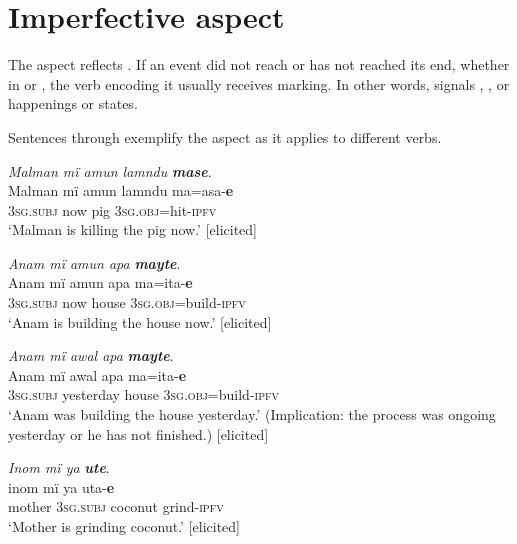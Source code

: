 
\section{{Imperfective} {aspect}}\label{sec:4.4}


The  aspect reflects . If an event did not reach or has not reached its end, whether in  or  , the verb encoding it usually receives  marking. In other words,   signals , , or  happenings or states.

  Sentences  through  exemplify the  aspect as it applies to different verbs.

\ea%
    \label{ex:verbs:17}
          \textit{Malman mï amun lamndu} \textbf{\textit{mase}}.\\
\gll Malman  mï    amun  lamndu  ma=asa-\textbf{e}\\
    [name]  3\textsc{sg.subj}  now  pig      3\textsc{sg.obj=}hit-\textsc{ipfv}\\
\glt `Malman is killing the pig now.’ [elicited]
\z

\ea%
    \label{ex:verbs:18}
          \textit{Anam mï amun apa} \textbf{\textit{mayte}}.\\
\gll Anam  mï      amun  apa  ma=ita-\textbf{e}\\
    [name]  3\textsc{sg.subj}  now  house  3\textsc{sg.obj=}build-\textsc{ipfv}\\
\glt `‎‎Anam is building the house now.’ [elicited]
\z

\ea%
    \label{ex:verbs:19}
          \textit{Anam mï awal apa} \textbf{\textit{mayte}}.\\
\gll Anam  mï      awal    apa    ma=ita-\textbf{e}\\
    [name]  3\textsc{sg.subj}  yesterday  house  3\textsc{sg.obj=}build-\textsc{ipfv}\\
\glt `Anam was building the house yesterday.’ (Implication: the process was ongoing yesterday or he has not finished.) [elicited]
\z

\ea%
    \label{ex:verbs:20}
          \textit{Inom mï ya} \textbf{\textit{ute}}.\\
\gll inom    mï    ya     uta-\textbf{e}\\
    mother  3\textsc{sg.subj}  coconut  grind-\textsc{ipfv}\\
\glt `Mother is grinding coconut.’ [elicited]
\z

